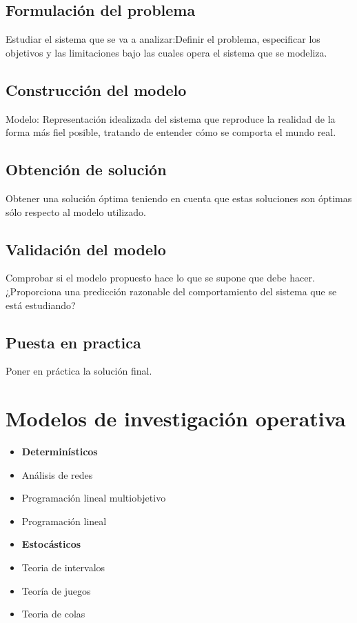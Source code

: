 \documentclass{article}
\begin{document}
\subsection{Formulación del problema}
Estudiar el sistema que se va a analizar:Definir el problema, especificar los objetivos y las limitaciones bajo las cuales opera el sistema que se modeliza.
\subsection{Construcción del modelo}
Modelo: Representación idealizada del sistema que reproduce la realidad de la forma más fiel posible, tratando de entender cómo se comporta el mundo real.
\subsection{Obtención de solución}
Obtener una solución óptima teniendo en cuenta que estas soluciones son óptimas sólo respecto al modelo utilizado.
\subsection{Validación del modelo}
Comprobar si el modelo propuesto hace lo que se supone que debe hacer.
¿Proporciona una predicción razonable del comportamiento del sistema que se está estudiando?
\subsection{Puesta en practica}
Poner en práctica la solución final.
\section{Modelos de investigación operativa}
\begin{minipage}[b]{0.5\linewidth}
\begin{itemize}
\item \textbf{Determinísticos}
\item Análisis de redes
\item Programación lineal multiobjetivo
\item Programación lineal
\end{itemize}
    \end{minipage} 
    \begin{minipage}[b]{0.5\linewidth} 
\begin{itemize}
\item \textbf{Estocásticos}
\item Teoria de intervalos
\item Teoría de juegos
\item Teoria de colas
\end{itemize}    
\end{minipage}
\end{document}
